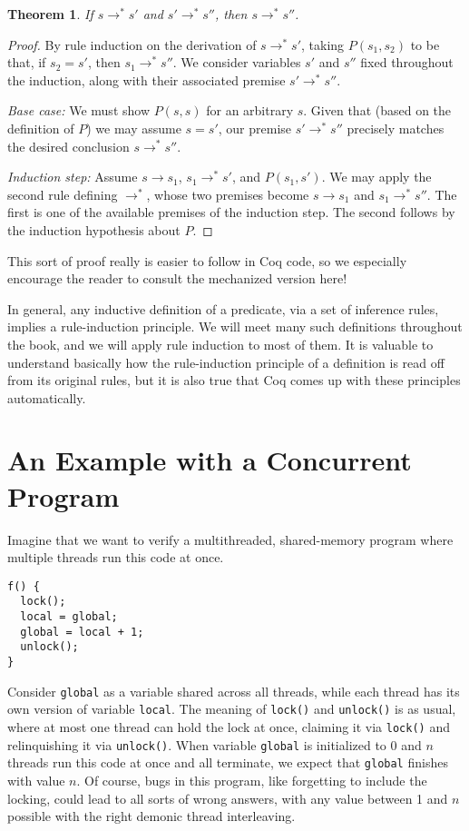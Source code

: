 \documentclass{amsbook}
\newtheorem{theorem}{Theorem}[chapter]
\theoremstyle{definition}
\theoremstyle{remark}
\numberwithin{section}{chapter}
\numberwithin{equation}{chapter}
\begin{document}
\begin{theorem}
  If $s \to^* s'$ and $s' \to^* s''$, then $s \to^* s''$.
\end{theorem}
\begin{proof}
  By rule induction on the derivation of $s \to^* s'$, taking $P(s_1, s_2)$ to be that, if $s_2 = s'$, then $s_1 \to^* s''$.  We consider variables $s'$ and $s''$ fixed throughout the induction, along with their associated premise $s' \to^* s''$.

  \emph{Base case:} We must show $P(s, s)$ for an arbitrary $s$.  Given that (based on the definition of $P$) we may assume $s = s'$, our premise $s' \to^* s''$ precisely matches the desired conclusion $s \to^* s''$.

  \emph{Induction step:} Assume $s \to s_1$, $s_1 \to^* s'$, and $P(s_1, s')$.  We may apply the second rule defining $\to^*$, whose two premises become $s \to s_1$ and $s_1 \to^* s''$.  The first is one of the available premises of the induction step.  The second follows by the induction hypothesis about $P$.
\end{proof}

This sort of proof really is easier to follow in Coq code, so we especially encourage the reader to consult the mechanized version here!

In general, any inductive definition of a predicate, via a set of inference rules, implies a rule-induction principle.
We will meet many such definitions throughout the book, and we will apply rule induction to most of them.
It is valuable to understand basically how the rule-induction principle of a definition is read off from its original rules, but it is also true that Coq comes up with these principles automatically.


\section{An Example with a Concurrent Program}

Imagine that we want to verify a multithreaded, shared-memory program where multiple threads run this code at once.
\begin{verbatim}
f() {
  lock();
  local = global;
  global = local + 1;
  unlock();
}
\end{verbatim}

Consider \texttt{global} as a variable shared across all threads, while each thread has its own version of variable \texttt{local}.
The meaning of \texttt{lock()} and \texttt{unlock()} is as usual, where at most one thread can hold the lock at once, claiming it via \texttt{lock()} and relinquishing it via \texttt{unlock()}.
When variable \texttt{global} is initialized to 0 and $n$ threads run this code at once and all terminate, we expect that \texttt{global} finishes with value $n$.
Of course, bugs in this program, like forgetting to include the locking, could lead to all sorts of wrong answers, with any value between 1 and $n$ possible with the right demonic thread interleaving.
\end{document}
